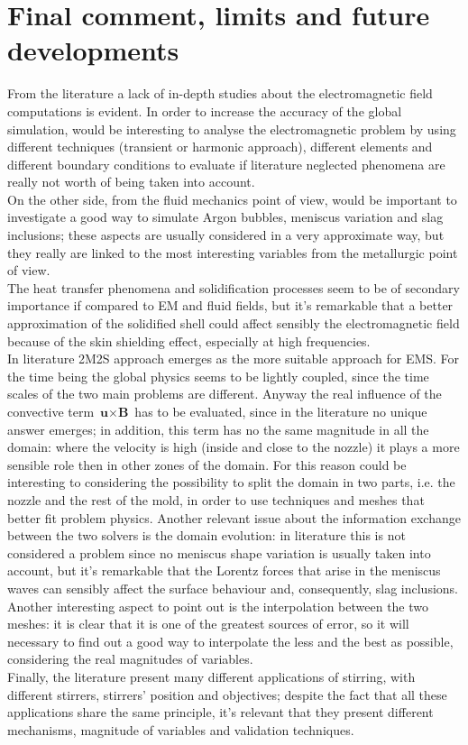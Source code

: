 \section{Final comment, limits and future developments}
From the literature a lack of in-depth studies about the electromagnetic field computations is evident. In order to increase the accuracy of the global simulation, would be interesting to analyse the electromagnetic problem by using different techniques (transient or harmonic approach), different elements and different boundary conditions to evaluate if literature neglected phenomena are really not worth of being taken into account. \\
On the other side, from the fluid mechanics point of view, would be important to investigate a good way to simulate Argon bubbles, meniscus variation and slag inclusions; these aspects are usually considered in a very approximate way, but they really are linked to the most interesting variables from the metallurgic point of view.\\
The heat transfer phenomena and solidification processes seem to be of secondary importance if compared to EM and fluid fields, but it's remarkable that a better approximation of the solidified shell could affect sensibly the electromagnetic field because of the skin shielding effect, especially at high frequencies.\\
In literature 2M2S approach emerges as the more suitable approach for EMS. For the time being the global physics seems to be lightly coupled, since the time scales of the two main problems are different. Anyway the real influence of the convective term $\textbf{u}\times \textbf{B}$ has to be evaluated, since in the literature no unique answer emerges; in addition, this term has no the same magnitude in all the domain: where the velocity is high (inside and close to the nozzle) it plays a more sensible role then in other zones of the domain. For this reason could be interesting to considering the possibility to split the domain in two parts, i.e. the nozzle and the rest of the mold, in order to use techniques and meshes that better fit problem physics. Another relevant issue about the information exchange between the two solvers is the domain evolution: in literature this is not considered a problem since no meniscus shape variation is usually taken into account, but it's remarkable that the Lorentz forces that arise in the meniscus waves can sensibly affect the surface behaviour and, consequently, slag inclusions. Another interesting aspect to point out is the interpolation between the two meshes: it is clear that it is one of the greatest sources of error, so it will necessary to find out a good way to interpolate the less and the best as possible, considering the real magnitudes of variables.\\
Finally, the literature present many different applications of stirring, with different stirrers, stirrers' position and objectives; despite the fact that all these applications share the same principle, it's relevant that they present different mechanisms, magnitude of variables and validation techniques.